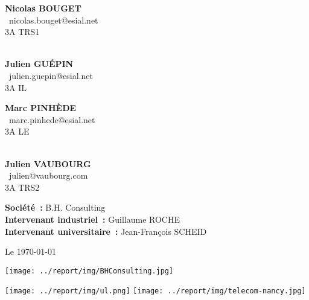 \documentclass[12pt]{article}
\begin{document}
\thispagestyle{empty}

\begin{multicols}{2}
{\large
	\begin{flushleft}
		\noindent{}\textbf{Nicolas BOUGET}\\
		\Letter~nicolas.bouget@esial.net\\
		3A TRS1\\~

		\noindent{}\textbf{Julien GUÉPIN}\\
		\Letter~julien.guepin@esial.net\\
		3A IL\\
	\end{flushleft}

	\begin{flushright}
		\noindent{}\textbf{Marc PINHÈDE}\\
		\Letter~marc.pinhede@esial.net\\
		3A LE\\~

		\noindent{}\textbf{Julien VAUBOURG}\\
		\Letter~julien@vaubourg.com\\
		3A TRS2\\
	\end{flushright}
}
\end{multicols}

\vspace{0.5cm}

\begin{center}
	{\Huge\textbf{\titreA}}

	\vspace{1cm}

	{\huge\emph{\titreB}}

	\vspace{1cm}

	\begin{flushleft}
		{\large
		\hspace{3.2cm}
		\textbf{Société~:} B.H. Consulting\\
		\hspace{3.2cm}
		\textbf{Intervenant industriel~:} Guillaume ROCHE\\
		\hspace{3.2cm}
		\textbf{Intervenant universitaire~:} Jean-François SCHEID
		}
	\end{flushleft}

	\vspace{1cm}
	{\large Le \today}

	\vspace{1.5cm}

	\texttt{[image: ../report/img/BHConsulting.jpg]}

	\vspace{0.2cm}

	\texttt{[image: ../report/img/ul.png]}
	\hspace{3.5cm}
	\texttt{[image: ../report/img/telecom-nancy.jpg]}
\end{center}
\newpage

\thispagestyle{empty}
\tableofcontents
\newpage
\end{document}

